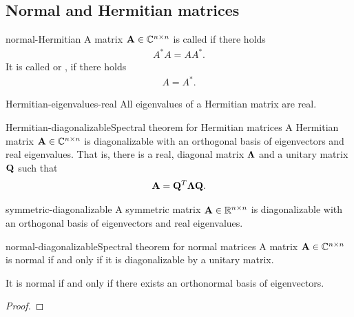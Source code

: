 \subsection{Normal and Hermitian matrices}

\begin{Definition}{normal-Hermitian}
  A matrix $\mathbf A\in\mathbb C^{n\times n}$ is called  if there holds
  \begin{gather}
      A^*A = AA^*.
  \end{gather}
  It is called  or , if there holds
  \begin{gather}
      A=A^*.
  \end{gather}
\end{Definition}

\begin{Lemma}{Hermitian-eigenvalues-real}
  All eigenvalues of a Hermitian matrix are real.
\end{Lemma}

\begin{Theorem*}{Hermitian-diagonalizable}{Spectral theorem for Hermitian matrices}
  A Hermitian matrix $\mathbf A\in\mathbb C^{n\times n}$ is diagonalizable with
  an orthogonal basis of eigenvectors and real eigenvalues. That is,
  there is a real, diagonal matrix $\boldsymbol\Lambda$ and a unitary matrix
  $\mathbf Q$ such that
  \begin{gather}
    \mathbf A = \mathbf Q^T \boldsymbol\Lambda\mathbf Q.
  \end{gather}
\end{Theorem*}


\begin{Corollary}{symmetric-diagonalizable}
  A symmetric matrix $\mathbf A\in\mathbb R^{n\times n}$ is diagonalizable with
  an orthogonal basis of eigenvectors and real eigenvalues.
\end{Corollary}

\begin{Theorem*}{normal-diagonalizable}{Spectral theorem for normal matrices}
  A matrix $\mathbf A\in\mathbb C^{n\times n}$ is normal if and only if it is diagonalizable by a unitary matrix.
  
  It is normal if and only if there exists an orthonormal basis of eigenvectors.
\end{Theorem*}

\begin{proof}
  
\end{proof}



